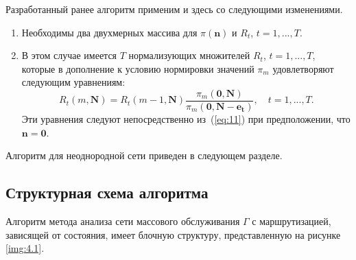 \documentclass[a4paper,14pt]{extarticle}
\theoremstyle{note}
\begin{document}
Разработанный ранее алгоритм применим и здесь со следующими изменениями.
\begin{enumerate}
\item Необходимы два двухмерных массива для $\pi(\mathbf{n})$ и $R_t$, $t=1,...,T$.
\item В этом случае имеется $T$ нормализующих множителей $R_t$, $t=1,...,T$, которые в дополнение к условию нормировки значений $\pi_m$ удовлетворяют следующим уравнениям:
\begin{equation}
 R_t(m,\mathbf{N}) = R_t(m-1,\mathbf{N}) \frac{\pi_m(\mathbf{0},\mathbf{N})}
 {\pi_m(\mathbf{0},\mathbf{N}-\mathbf{e_t})}, \quad t=1,...,T .
 \label{eq:12}
\end{equation}
Эти уравнения следуют непосредственно из~(\ref{eq:11}) при предположении, что $\mathbf{n}=\mathbf{0}$.
\end{enumerate}

Алгоритм для неоднородной сети приведен в следующем разделе.

\subsection{Структурная схема алгоритма}
\label{subsec:flowchart}

Алгоритм метода анализа сети массового обслуживания $\Gamma$ с маршрутизацией, зависящей от состояния, имеет блочную структуру, представленную на рисунке \ref{img:4.1}.
\end{document}
